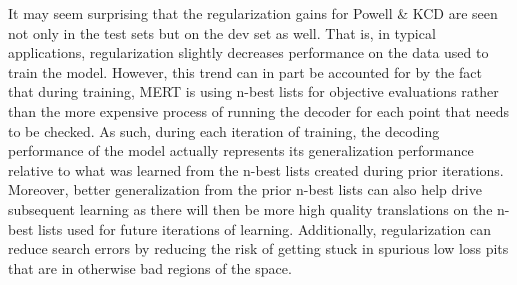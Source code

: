 \documentclass[11pt,tightenlines,kern-1pt]{article}
\begin{document}
It may seem surprising that the regularization gains for Powell \& KCD are seen not only in the test sets but on the dev set as well. That is, in typical applications, regularization slightly decreases performance on the data used to train the model. However, this trend can in part be accounted for by the fact that during training, MERT is using n-best lists for objective evaluations rather than the more expensive process of running the decoder for each point that needs to be checked. As such, during each iteration of training, the decoding performance of the model actually represents its generalization performance relative to what was learned from the n-best lists created during prior iterations. Moreover, better generalization from the prior n-best lists can also help drive subsequent learning as there will then be more high quality translations on the n-best lists used for future iterations of learning. Additionally, regularization can reduce search errors by reducing the risk of getting stuck in spurious low loss pits that are in otherwise bad regions of the space.

\end{document}
